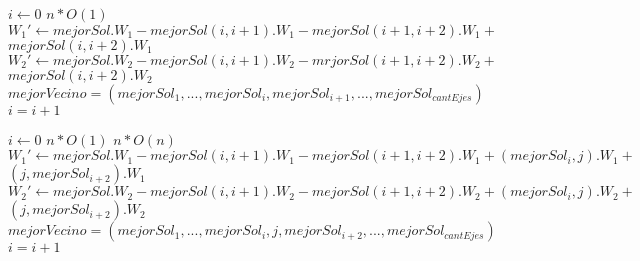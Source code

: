 \begin{flushleft}
 \begin{figure}[H]
  \begin{pseudo}
   \State $i \leftarrow 0$
   \hfill$n*O(1)$
	  \State $W_1' \leftarrow mejorSol.W_1 - mejorSol(i,i+1).W_1 - mejorSol(i+1,i+2).W_1 + $
	  \State$mejorSol(i,i+2).W_1$
	  \State $W_2' \leftarrow mejorSol.W_2 - mejorSol(i,i+1).W_2 - mrjorSol(i+1,i+2).W_2 + $
	  \State $mejorSol(i,i+2).W_2$
	    \State $mejorVecino = (mejorSol_1, ... ,mejorSol_i, mejorSol_{i+1}, ..., mejorSol_{cantEjes})$
	  \EndIf
      \EndIf
      \State $i = i+1$
   \EndWhile
   \EndProcedure
  \end{pseudo}
 \end{figure}
\end{flushleft}

\begin{flushleft}
 \begin{figure}[H]
  \begin{pseudo}
   \State $i \leftarrow 0$
   \hfill$n*O(1)$
      \hfill$n*O(n)$
	  \State $W_1' \leftarrow mejorSol.W_1 - mejorSol(i,i+1).W_1 - mejorSol(i+1,i+2).W_1 + (mejorSol_i, j).W_1 + $
	  \State $(j, mejorSol_{i+2}).W_1$
	  \State $W_2' \leftarrow mejorSol.W_2 - mejorSol(i,i+1).W_2 - mejorSol(i+1,i+2).W_2 + (mejorSol_i, j).W_2 + $
	  \State $(j, mejorSol_{i+2}).W_2$
	    \State $mejorVecino = (mejorSol_1, ... ,mejorSol_i, j ,mejorSol_{i+2}, ..., mejorSol_{cantEjes})$
	  \EndIf
      \EndFor
      \State $i = i+1$
   \EndWhile
   \EndProcedure
  \end{pseudo}
 \end{figure}
\end{flushleft}


